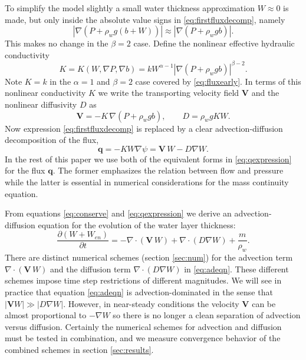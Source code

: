 \documentclass[11pt,final]{amsart}
\newcommand\bV{\mathbf{V}}
\newcommand\bq{\mathbf{q}}
\newcommand{\Div}{\nabla\cdot}
\newcommand{\grad}{\nabla}
\begin{document}
To simplify the model slightly a small water thickness approximation $W\approx 0$ is made, but only inside the absolute value signs in \eqref{eq:firstfluxdecomp}, namely
\begin{equation}
\left|\grad \left(P + \rho_w g (b+W) \right)\right| \approx \left|\grad \left(P + \rho_w g b \right)\right|.  \label{eq:Wsmall}
\end{equation}
This makes no change in the $\beta=2$ case.  Define the nonlinear effective hydraulic conductivity
\begin{equation}
K = K(W,\grad P,\grad b) = k W^{\alpha-1} \left|\grad(P+\rho_w g b)\right|^{\beta - 2}. \label{eq:Kdefine}
\end{equation}
Note $K = k$ in the $\alpha=1$ and $\beta=2$ case covered by \eqref{eq:fluxearly}.  In terms of this nonlinear conductivity $K$ we write the transporting velocity field $\bV$ and the nonlinear diffusivity $D$ as
\begin{equation} \label{eq:vexpression}
  \bV = - K\, \grad \left(P + \rho_w g b\right), \qquad D = \rho_w g K W.
\end{equation}
Now expression \eqref{eq:firstfluxdecomp} is replaced by a clear advection-diffusion decomposition of the flux,
\begin{equation} \label{eq:qexpression}
  \bq = - K W \grad \psi = \bV\, W - D \grad W.
\end{equation}
In the rest of this paper we use both of the equivalent forms in \eqref{eq:qexpression} for the flux $\bq$.  The former emphasizes the relation between flow and pressure while the latter is essential in numerical considerations for the mass continuity equation.

From equations \eqref{eq:conserve} and \eqref{eq:qexpression} we derive an advection-diffusion equation \citep{HundsdorferVerwer2010} for the evolution of the water layer thickness:
\begin{equation} \label{eq:adeqn}
  \frac{\partial (W+W_{en})}{\partial t} = - \Div\left(\bV\, W\right) + \Div \left(D \grad W\right) + \frac{m}{\rho_w}.
\end{equation}
There are distinct numerical schemes (section \ref{sec:num}) for the advection term $\Div\left(\bV\, W\right)$ and the diffusion term $\Div \left(D \grad W\right)$ in \eqref{eq:adeqn}.  These different schemes impose time step restrictions of different magnitudes.  We will see in practice that equation \eqref{eq:adeqn} is advection-dominated in the sense that $|\bV W| \gg |D \grad W|$.  However, in near-steady conditions the velocity $\bV$ can be almost proportional to $-\grad W$ so there is no longer a clean separation of advection versus diffusion.  Certainly the numerical schemes for advection and diffusion must be tested in combination, and we measure convergence behavior of the combined schemes in section \ref{sec:results}.
\end{document}
